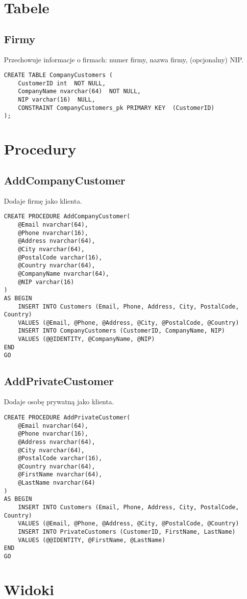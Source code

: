 \section{Tabele}
\subsection{Firmy}
Przechowuje informacje o firmach: numer firmy, nazwa firmy, (opcjonalny) NIP.
\begin{verbatim}
CREATE TABLE CompanyCustomers (
    CustomerID int  NOT NULL,
    CompanyName nvarchar(64)  NOT NULL,
    NIP varchar(16)  NULL,
    CONSTRAINT CompanyCustomers_pk PRIMARY KEY  (CustomerID)
);
\end{verbatim}
\section{Procedury}
\subsection{AddCompanyCustomer}
Dodaje firmę jako klienta.
\begin{verbatim}
CREATE PROCEDURE AddCompanyCustomer(
    @Email nvarchar(64),
    @Phone nvarchar(16),
    @Address nvarchar(64),
    @City nvarchar(64),
    @PostalCode varchar(16),
    @Country nvarchar(64),
    @CompanyName nvarchar(64),
    @NIP varchar(16)
)
AS BEGIN
    INSERT INTO Customers (Email, Phone, Address, City, PostalCode, Country)
    VALUES (@Email, @Phone, @Address, @City, @PostalCode, @Country)
    INSERT INTO CompanyCustomers (CustomerID, CompanyName, NIP)
    VALUES (@@IDENTITY, @CompanyName, @NIP)
END
GO
\end{verbatim}
\subsection{AddPrivateCustomer}
Dodaje osobę prywatną jako klienta.
\begin{verbatim}
CREATE PROCEDURE AddPrivateCustomer(
    @Email nvarchar(64),
    @Phone nvarchar(16),
    @Address nvarchar(64),
    @City nvarchar(64),
    @PostalCode varchar(16),
    @Country nvarchar(64),
    @FirstName nvarchar(64),
    @LastName nvarchar(64)
)
AS BEGIN
    INSERT INTO Customers (Email, Phone, Address, City, PostalCode, Country)
    VALUES (@Email, @Phone, @Address, @City, @PostalCode, @Country)
    INSERT INTO PrivateCustomers (CustomerID, FirstName, LastName) 
    VALUES (@@IDENTITY, @FirstName, @LastName)
END
GO
\end{verbatim}
\section{Widoki}
